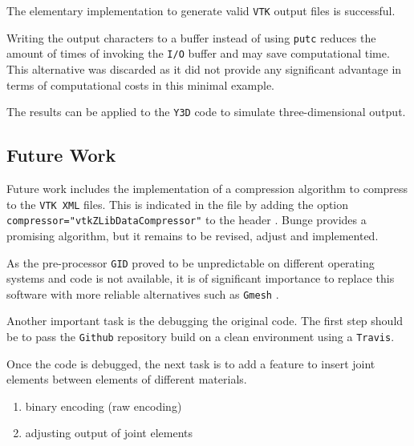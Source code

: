 The elementary implementation to generate valid \texttt{VTK} output files is successful.

Writing the output characters to a buffer instead of using \lstinline{putc} reduces the amount of times of invoking the \texttt{I/O} buffer and may save computational time. This alternative was discarded as it did not provide any significant advantage in terms of computational costs in this minimal example.

\bigbreak
The results can be applied to the \texttt{Y3D} code to simulate three-dimensional output.

\subsection{Future Work}

Future work includes the implementation of a compression algorithm to compress to the \texttt{VTK XML} files. This is indicated in the file by adding the option \lstinline[language=XML]{compressor="vtkZLibDataCompressor"} to the header \cite{Kit}. Bunge \cite{Bun09} provides a promising algorithm, but it remains to be revised, adjust and implemented. 

\bigbreak
As the pre-processor \texttt{GID} proved to be unpredictable on different operating systems and code is not available, it is of significant importance to replace this software with more reliable alternatives such as \texttt{Gmesh} \cite{Geu09}.

\bigbreak
Another important task is the debugging the original code. The first step should be to pass the \texttt{Github} repository build on a clean environment using a \texttt{Travis}. 

\bigbreak
Once the code is debugged, the next task is to add a feature to insert joint elements between elements of different materials.

\begin{enumerate}
    \item binary encoding (raw encoding)
    \item adjusting output of joint elements
\end{enumerate}